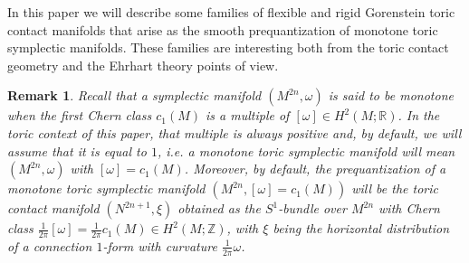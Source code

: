 \documentclass[a4paper,11pt,reqno]{amsart}
\newcommand{\R}{\mathbb R}
\newcommand{\Z}{\mathbb Z}
\newtheorem{remark}[theorem]{Remark}
\begin{document}
In this paper we will describe some families of flexible and rigid Gorenstein toric contact 
manifolds that arise as the smooth prequantization of monotone toric symplectic manifolds. 
These families are interesting both from the toric contact geometry and the Ehrhart theory 
points of view. 

\begin{remark} \label{rem:monotone}
Recall that a symplectic manifold $(M^{2n}, \omega)$ is said to be \emph{monotone} when
the first Chern class $c_1 (M)$ is a multiple of $[\omega] \in H^2 (M; \R)$. In the toric
context of this paper, that multiple is always positive and, by default, we will assume that it is equal
to $1$, i.e. a monotone toric symplectic manifold will mean $(M^{2n}, \omega)$ with $[\omega] = c_1 (M)$. 
Moreover, by default, the prequantization of a monotone toric symplectic manifold $(M^{2n}, [\omega] = c_1 (M))$ 
will be the toric contact manifold $(N^{2n+1}, \xi)$ obtained as the $S^1$-bundle over $M^{2n}$ with Chern class 
$\frac{1}{2\pi}[\omega] = \frac{1}{2\pi} c_1 (M) \in H^2 (M; \Z)$, with $\xi$ being the horizontal distribution of a 
connection $1$-form with curvature $\frac{1}{2\pi}\omega$.
\end{remark}
\end{document}
